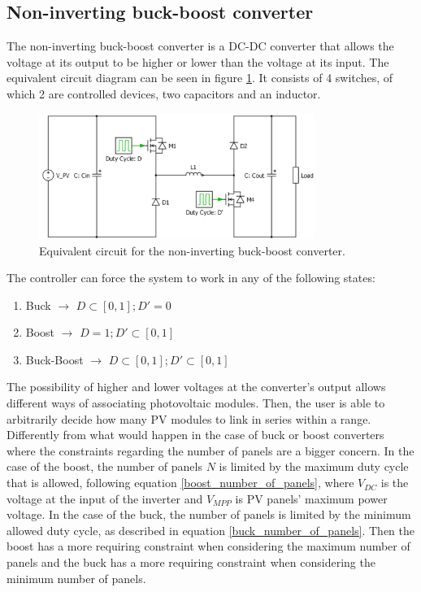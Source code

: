 
\subsection{Non-inverting buck-boost converter\label{N_INV_BB}}
		
The non-inverting buck-boost converter is a DC-DC converter that allows the voltage at its output to be higher or lower than the voltage at its input. The equivalent circuit diagram can be seen in figure \ref{N_INV_BB_SCHEMATIC}. It consists of 4 switches, of which 2 are controlled devices, two capacitors and an inductor.
		
\begin{figure}[H]
	\begin{center}
	\includegraphics[width=0.8\textwidth]{../Pictures/2_d_H_B_BB}
	\caption{Equivalent circuit for the non-inverting buck-boost converter.}
	\label{N_INV_BB_SCHEMATIC}
	\end{center}	
\end{figure}
	
The controller can force the system to work in any of the following states:

\begin{enumerate}
	\item Buck $\rightarrow$ $ D \subset [0,1];	 D' = 0 $
	\item Boost $\rightarrow$ $ D = 1;	 D' \subset [0,1] $
	\item Buck-Boost $\rightarrow$ $ D \subset [0,1]; D' \subset [0,1] $
\end{enumerate}
		
The possibility of higher and lower voltages at the converter's output allows different ways of associating photovoltaic modules. Then, the user is able to arbitrarily decide how many PV modules to link in series within a range. Differently from what would happen in the case of buck or boost converters where the constraints regarding the number of panels are a bigger concern. In the case of the boost, the number of panels $N$ is limited by the maximum duty cycle that is allowed, following equation \ref{boost_number_of_panels}, where $V_{DC} $ is the voltage at the input of the inverter and $V_{MPP}$ is PV panels' maximum power voltage. In the case of the buck, the number of panels is limited by the minimum allowed duty cycle, as described in equation \ref{buck_number_of_panels}. Then the boost has a more requiring constraint when considering the maximum number of panels and the buck has a more requiring constraint when considering the minimum number of panels.

